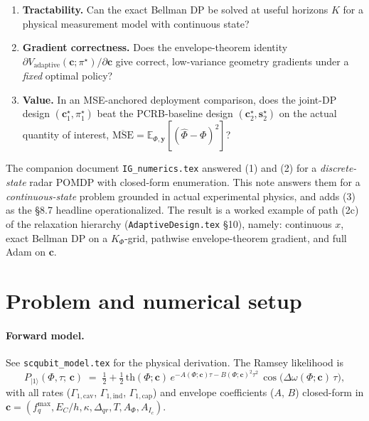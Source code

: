 \documentclass[11pt,a4paper]{article}
\newcommand{\E}{\mathbb{E}}
\begin{document}
\begin{enumerate}[nosep,leftmargin=2em]
  \item \textbf{Tractability.}  Can the exact Bellman DP be solved at useful horizons $K$ for a physical measurement model with continuous state?
  \item \textbf{Gradient correctness.}  Does the envelope-theorem identity $\partial V_{\text{adaptive}}(\bm c; \pi^\star) / \partial \bm c$ give correct, low-variance geometry gradients under a \emph{fixed} optimal policy?
  \item \textbf{Value.}  In an MSE-anchored deployment comparison, does the joint-DP design $(\bm c_1^\star, \pi_1^\star)$ beat the PCRB-baseline design $(\bm c_2^\star, \bm s_2^\star)$ on the actual quantity of interest, $\overline{\mathrm{MSE}} = \E_{\Phi, \bm y}[(\hat \Phi - \Phi)^2]$?
\end{enumerate}

The companion document \texttt{IG\_numerics.tex} answered (1) and (2) for a \emph{discrete-state} radar POMDP with closed-form enumeration.  This note answers them for a \emph{continuous-state} problem grounded in actual experimental physics, and adds (3) as the \S8.7 headline operationalized.  The result is a worked example of path (2c) of the relaxation hierarchy (\texttt{AdaptiveDesign.tex} \S10), namely: continuous $x$, exact Bellman DP on a $K_\Phi$-grid, pathwise envelope-theorem gradient, and full Adam on $\bm c$.

\section{Problem and numerical setup}
\label{sec:setup}

\paragraph{Forward model.}  See \texttt{scqubit\_model.tex} for the physical derivation.  The Ramsey likelihood is
\begin{equation}
  P_{|1\rangle}(\Phi, \tau;\, \bm c) \;=\; \tfrac{1}{2} + \tfrac{1}{2}\,\mathrm{th}(\Phi;\bm c)\,e^{-A(\Phi;\bm c)\tau - B(\Phi;\bm c)^2\tau^2}\,\cos\!\bigl(\Delta\omega(\Phi;\bm c)\,\tau\bigr),
  \label{eq:ramsey}
\end{equation}
with all rates ($\Gamma_{1,\text{cav}}$, $\Gamma_{1,\text{ind}}$, $\Gamma_{1,\text{cap}}$) and envelope coefficients ($A$, $B$) closed-form in $\bm c = (f_q^{\max}, E_C/h, \kappa, \Delta_{qr}, T, A_\Phi, A_{I_c})$.
\end{document}

